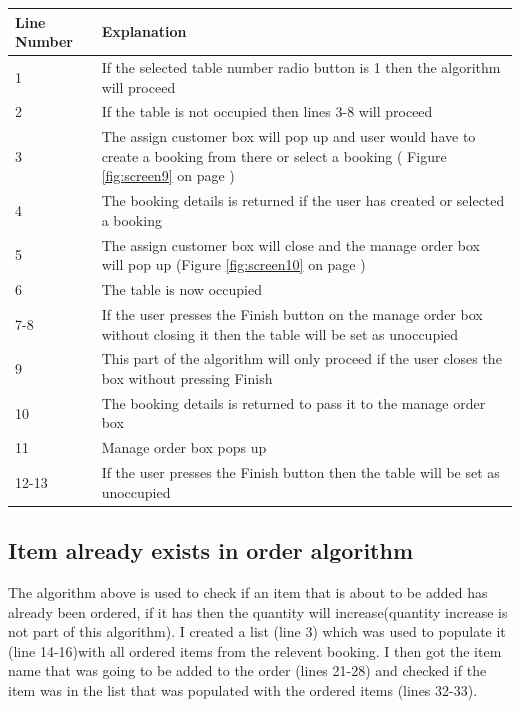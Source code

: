\begin{center}
\begin{tabular}{|p{5cm}|p{7.5cm}|}
\hline
\textbf{Line Number} & \textbf{Explanation} \\ \hline
1 & If the selected table number radio button is 1 then the algorithm will proceed \\ \hline
2 & If the table is not occupied then lines 3-8 will proceed \\ \hline
3 & The assign customer box will pop up and user would have to create a booking from there or select a booking ( Figure \ref{fig:screen9} on page \pageref{fig:screen9}) \\ \hline
4 & The booking details is returned if the user has created or selected a booking \\ \hline
5 & The assign customer box will close and the manage order box will pop up  (Figure \ref{fig:screen10} on page \pageref{fig:screen10}) \\ \hline
6 & The table is now occupied \\ \hline
7-8 & If the user presses the Finish button on the manage order box without closing it then the table will be set as unoccupied \\ \hline
9 & This part of the algorithm will only proceed if the user closes the box without pressing Finish \\ \hline
10 & The booking details is returned to pass it to the manage order box \\ \hline
11& Manage order box pops up \\ \hline
12-13 & If the user presses the Finish button then the table will be set as unoccupied \\ \hline
 
\end{tabular}
\end{center}

\subsection{Item already exists in order algorithm}
\newpage
{}
The algorithm above is used to check if an item that is about to be added has already been ordered, if it has then the quantity will increase(quantity increase is not part of this algorithm). I created a list (line 3) which was used to populate it (line 14-16)with all ordered items from the relevent booking. I then got the item name that was going to be added to the order (lines 21-28) and checked if the item was in the list that was populated with the ordered items (lines 32-33).


